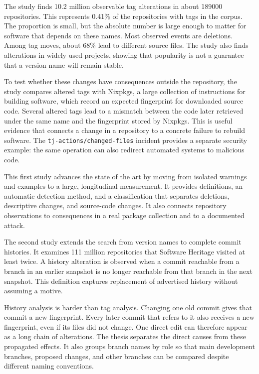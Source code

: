 \begin{SingleSpace}
The study finds \num{10.2} million observable tag alterations in about \num{189000} repositories.
This represents \num{0.41}\% of the repositories with tags in the corpus.
The proportion is small, but the absolute number is large enough to matter for software that depends on these names.
Most observed events are deletions.
Among tag moves, about \num{68}\% lead to different source files.
The study also finds alterations in widely used projects, showing that popularity is not a guarantee that a version name will remain stable.

To test whether these changes have consequences outside the repository, the study compares altered tags with Nixpkgs, a large collection of instructions for building software, which record an expected fingerprint for downloaded source code.
Several altered tags lead to a mismatch between the code later retrieved under the same name and the fingerprint stored by Nixpkgs.
This is useful evidence that connects a change in a repository to a concrete failure to rebuild software.
The \texttt{tj-actions/changed-files} incident provides a separate security example: the same operation can also redirect automated systems to malicious code.

This first study advances the state of the art by moving from isolated warnings and examples to a large, longitudinal measurement.
It provides definitions, an automatic detection method, and a classification that separates deletions, descriptive changes, and source-code changes.
It also connects repository observations to consequences in a real package collection and to a documented attack.

The second study extends the search from version names to complete commit histories.
It examines \num{111} million repositories that Software Heritage visited at least twice.
A history alteration is observed when a commit reachable from a branch in an earlier snapshot is no longer reachable from that branch in the next snapshot.
This definition captures replacement of advertised history without assuming a motive.

History analysis is harder than tag analysis.
Changing one old commit gives that commit a new fingerprint.
Every later commit that refers to it also receives a new fingerprint, even if its files did not change.
One direct edit can therefore appear as a long chain of alterations.
The thesis separates the direct causes from these propagated effects.
It also groups branch names by role so that main development branches, proposed changes, and other branches can be compared despite different naming conventions.


\end{SingleSpace}
